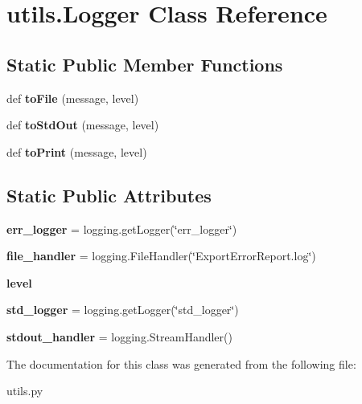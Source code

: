 \hypertarget{classutils_1_1_logger}{}\section{utils.\+Logger Class Reference}
\label{classutils_1_1_logger}
\subsection*{Static Public Member Functions}
\begin{DoxyCompactItemize}
\item 
\mbox{\label{classutils_1_1_logger_a6ff0c200199caaccce3e86c26d077070}} 
def {\bfseries to\+File} (message, level)
\item 
\mbox{\label{classutils_1_1_logger_ab35afc69dca57dcf823dbcd9f21de52f}} 
def {\bfseries to\+Std\+Out} (message, level)
\item 
\mbox{\label{classutils_1_1_logger_ad9adabae965475f214cfbe8b33012192}} 
def {\bfseries to\+Print} (message, level)
\end{DoxyCompactItemize}
\subsection*{Static Public Attributes}
\begin{DoxyCompactItemize}
\item 
\mbox{\label{classutils_1_1_logger_a1a68cc9c9c88a2bcc6f4630189923350}} 
{\bfseries err\+\_\+logger} = logging.\+get\+Logger(\char`\"{}err\+\_\+logger\char`\"{})
\item 
\mbox{\label{classutils_1_1_logger_a8571a93b08c6102ae4e6d388e759c9a6}} 
{\bfseries file\+\_\+handler} = logging.\+File\+Handler(\char`\"{}Export\+Error\+Report.\+log\char`\"{})
\item 
\mbox{\label{classutils_1_1_logger_a3dae13aab2dbc2a08b8271fe7e939e8c}} 
{\bfseries level}
\item 
\mbox{\label{classutils_1_1_logger_a3c6b16342a1801f681ef3630dee95447}} 
{\bfseries std\+\_\+logger} = logging.\+get\+Logger(\char`\"{}std\+\_\+logger\char`\"{})
\item 
\mbox{\label{classutils_1_1_logger_a836600792034633b659280c747aa4d55}} 
{\bfseries stdout\+\_\+handler} = logging.\+Stream\+Handler()
\end{DoxyCompactItemize}


The documentation for this class was generated from the following file\+:\begin{DoxyCompactItemize}
\item 
utils.\+py\end{DoxyCompactItemize}

